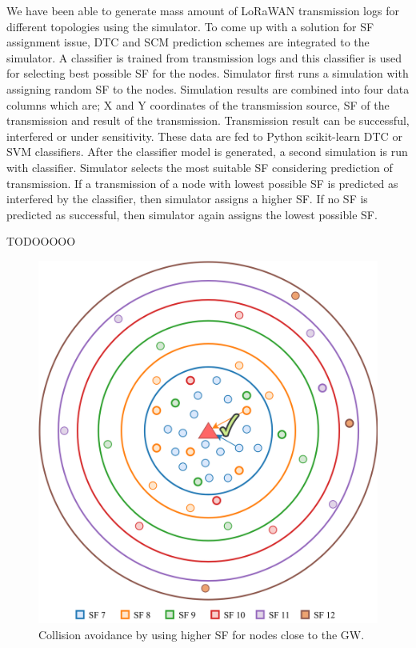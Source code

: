 \documentclass[conference]{IEEEtran}
\begin{document}
\par We have been able to generate mass amount of LoRaWAN transmission logs for different topologies using the simulator. To come up with a solution for SF assignment issue, DTC and SCM prediction schemes are integrated to the simulator. A classifier is trained from transmission logs and this classifier is used for selecting best possible SF for the nodes. Simulator first runs a simulation with assigning random SF to the nodes. Simulation results are combined into four data columns which are; X and Y coordinates of the transmission source, SF of the transmission and result of the transmission. Transmission result can be successful, interfered or under sensitivity. These data are fed to Python scikit-learn DTC or SVM classifiers. After the classifier model is generated, a second simulation is run with classifier. Simulator selects the most suitable SF considering prediction of transmission. If a transmission of a node with lowest possible SF is predicted as interfered by the classifier, then simulator assigns a higher SF. If no SF is predicted as successful, then simulator again assigns the lowest possible SF.

TODOOOOO

\begin{figure}
\centering
\includegraphics[width=\linewidth]{collision_solution_single_gw}
\caption{Collision avoidance by using higher SF for nodes close to the GW.}
\label{fig:collision_solution_single_gw}
\end{figure}
\end{document}
